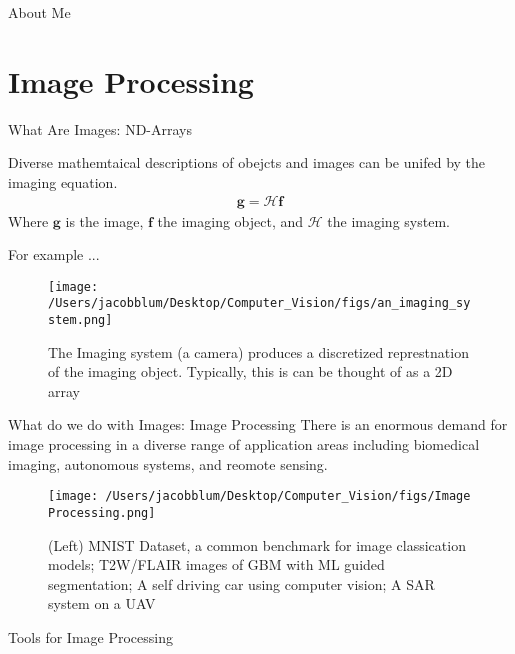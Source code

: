 \documentclass{beamer}
\begin{document}
\begin{frame}[plain]{About Me}
\begin{enumerate}
\begin{itemize}
        
        \end{itemize}
    \end{enumerate}
    
\end{frame}


\section{Image Processing}
\begin{frame}[plain]{What Are Images: ND-Arrays}
\begin{definition}
    Diverse mathemtaical descriptions of obejcts and images can be unifed by the imaging equation.
    \begin{align}
        \mathbf{g} = \boldsymbol{\mathcal{H}}\mathbf{f}
    \end{align}
    Where $\mathbf{g}$ is the image, $\mathbf{f}$ the imaging object, and $\mathcal{H}$ the imaging system.

    For example ...

    \begin{figure}
        \centering
            \texttt{[image: /Users/jacobblum/Desktop/Computer\_Vision/figs/an\_imaging\_system.png]}
            \caption{The Imaging system (a camera) produces a discretized represtnation of the imaging object. Typically, this is can be thought of as a 2D array}
        \end{figure}
    \end{definition}
\end{frame}

\begin{frame}[plain]{What do we do with Images: Image Processing}
    There is an enormous demand for image processing in a diverse range of application areas including biomedical imaging, autonomous systems, and reomote sensing.
    \begin{figure}
        \centering
            \texttt{[image: /Users/jacobblum/Desktop/Computer\_Vision/figs/Image Processing.png]}
            \caption{(Left) MNIST Dataset, a common benchmark for image classication models; T2W/FLAIR images of GBM with ML guided segmentation; A self driving car using computer vision; A SAR system on a UAV}
        \end{figure}
\end{frame}


\begin{frame}[plain]{Tools for Image Processing}



\end{frame}
\end{document}
